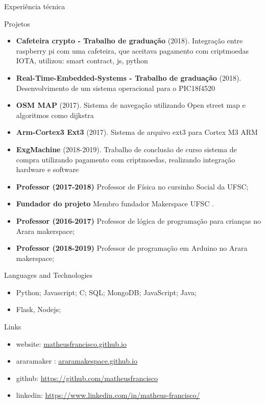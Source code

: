 \documentclass[]{mcdowellcv}
\begin{document}
	\begin{cvsection}{Experiência técnica}
		\begin{cvsubsection}{Projetos}{}{}
			\begin{itemize}
				\item \textbf{Cafeteira crypto - Trabalho de graduação} (2018). Integração entre raspberry pi com uma cafeteira, que aceitava pagamento com criptmoedas IOTA, utilizou: smart contract, js, python
				\item \textbf{Real-Time-Embedded-Systems - Trabalho de graduação} (2018). Desenvolvimento de um sistema operacional para o  PIC18f4520
				\item \textbf{OSM MAP} (2017).  Sistema de navegação utilizando Open street map e  algoritmos como  dijkstra
				\item \textbf{Arm-Cortex3 Ext3} (2017).  Sistema de arquivo ext3 para Cortex M3 ARM
				\item \textbf{ExgMachine} (2018-2019).  Trabalho de conclusão de curso sistema de compra utilizando pagamento com criptmoedas, realizando integração hardware e software
				\item \textbf{Professor (2017-2018)} Professor de Física no cursinho Social da UFSC;
				\item \textbf{Fundador do projeto} Membro fundador Makerspace UFSC .
				\item \textbf{Professor (2016-2017)} Professor de lógica de programação para crianças no Arara makerspace;
				\item \textbf{Professor (2018-2019)} Professor de programação em Arduino no Arara makerspace;
			\end{itemize}
		\end{cvsubsection}
	\end{cvsection}
	
	
	\begin{cvsection}{Languages and Technologies}
		\begin{cvsubsection}{}{}{}	
			\begin{itemize}
				\item Python; Javascript; C; SQL; MongoDB; JavaScript; Java;
				\item Flask, Nodejs; 
			\end{itemize}
		\end{cvsubsection}
	\end{cvsection}

	\begin{cvsection}{Links}
		\begin{cvsubsection}{}{}{}	
			\begin{itemize}
				\item website: \url{matheusfrancisco.github.io}
				\item araramaker :  \url{araramakespace.github.io}
				\item github: \url{https://github.com/matheusfrancisco}
				\item linkedin: \url{https://www.linkedin.com/in/matheus-francisco/} 
			\end{itemize}
		\end{cvsubsection}
	\end{cvsection}
	
\end{document}
